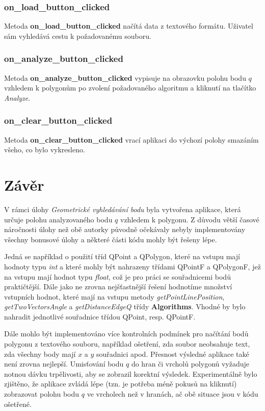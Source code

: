 \documentclass[a4paper, 12pt]{article}
\begin{document}
\subsubsection{on\_load\_button\_clicked}
Metoda \textbf{on\_load\_button\_clicked} načítá data z textového formátu. Uživatel sám vyhledává cestu k požadovanému souboru.

\subsubsection{on\_analyze\_button\_clicked}
Metoda \textbf{on\_analyze\_button\_clicked} vypisuje na obrazovku polohu bodu $q$ vzhledem k polygonům po zvolení požadovaného algoritmu a kliknutí na tlačítko \textsl{Analyze}.

\subsubsection{on\_clear\_button\_clicked}
Metoda \textbf{on\_clear\_button\_clicked} vrací aplikaci do výchozí polohy smazáním všeho, co bylo vykresleno. 

\clearpage
\section{Závěr}
V rámci úlohy \textit{Geometrické vyhledávání bodu} byla vytvořena aplikace, která určuje polohu analyzovaného bodu $q$ vzhledem k polygonu. Z důvodu větší časové náročnosti úlohy než obě autorky původně očekávaly nebyly implementovány všechny bonusové úlohy a některé části kódu mohly být řešeny lépe.  

Jedná se například o použití tříd QPoint a QPolygon, které na vstupu mají hodnoty typu \textit{int} a které mohly být nahrazeny třídami QPointF a QPolygonF, jež na vstupu mají hodnot typu \textit{float}, což je pro práci se souřadnicemi bodů praktičtější. Dále jako ne zrovna nejšťastnější řešení hodnotíme množství vstupních hodnot, které mají na vstupu metody \textit{getPointLinePosition}, \textit{getTwoVectorsAngle} a \textit{getDistanceEdgeQ} třídy \textbf{Algorithms}. Vhodné by bylo nahradit jednotlivé souřadnice třídou QPoint, resp. QPointF. 

Dále mohlo být implementováno více kontrolních podmínek pro načítání bodů polygonu z textového souboru, například ošetření, zda soubor neobsahuje text, zda všechny body mají $x$ a $y$ souřadnici apod. Přesnost výsledné aplikace také není zrovna nejlepší. Umisťování bodu $q$ do hran či vrcholů polygonů vyžaduje notnou dávku trpělivosti, aby se zobrazil korektní výsledek. Experimentálně bylo zjištěno, že aplikace zvládá lépe (tzn. je potřeba méně pokusů na kliknutí) zobrazovat polohu bodu $q$ ve vrcholech než v hranách, ač obě situace jsou v kódu ošetřené. 
\end{document}
